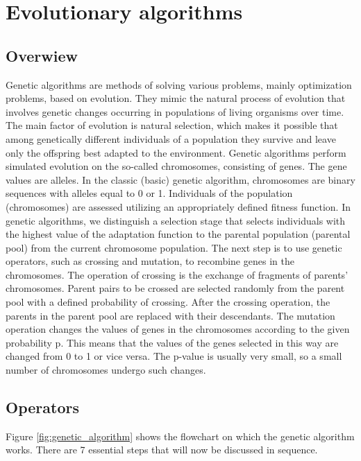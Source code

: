 \FloatBarrier
\section{Evolutionary algorithms}

\FloatBarrier
\subsection{Overwiew}
Genetic algorithms are methods of solving various problems, mainly optimization problems, 
based on evolution. 
They mimic the natural process of evolution that involves genetic changes occurring in populations 
of living organisms over time. 
The main factor of evolution is natural selection, which makes it possible that among genetically 
different individuals of a population they survive and leave only the offspring best adapted to 
the environment. 
Genetic algorithms perform simulated evolution on the so-called chromosomes, consisting of genes.
The gene values are alleles. In the classic (basic) genetic algorithm, chromosomes are binary 
sequences with alleles equal to 0 or 1. 
Individuals of the population (chromosomes) are assessed utilizing an appropriately defined fitness 
function. 
In genetic algorithms, we distinguish a selection stage that selects individuals with the highest 
value of the adaptation function to the parental population (parental pool) from the current 
chromosome population. 
The next step is to use genetic operators, such as crossing and mutation, to recombine genes 
in the chromosomes. 
The operation of crossing is the exchange of fragments of parents' chromosomes. Parent pairs to be 
crossed are selected randomly from the parent pool with a defined probability of crossing. 
After the crossing operation, the parents in the parent pool are replaced with their descendants. 
The mutation operation changes the values of genes in the chromosomes according to the given 
probability p. 
This means that the values of the genes selected in this way are changed from 0 to 1 or 
vice versa. 
The p-value is usually very small, so a small number of chromosomes undergo such changes.


\FloatBarrier
\subsection{Operators}
Figure \ref{fig:genetic_algorithm} shows the flowchart on which the genetic algorithm works.
There are 7 essential steps that will now be discussed in sequence.

